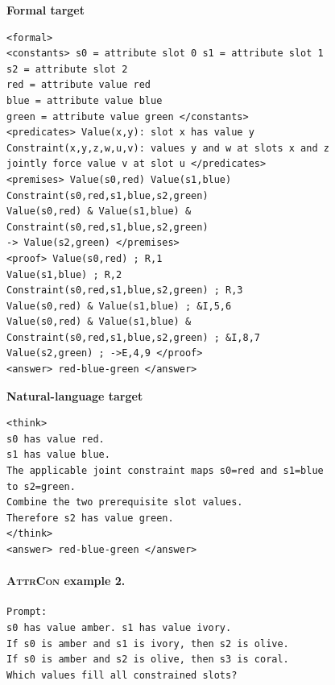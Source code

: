 \documentclass[11pt]{article}
\newcommand{\attrcon}{\textsc{AttrCon}}
\begin{document}
\noindent\begin{minipage}[t]{0.48\linewidth}
\textbf{Formal target}
\scriptsize
\begin{verbatim}
<formal>
<constants> s0 = attribute slot 0 s1 = attribute slot 1
s2 = attribute slot 2
red = attribute value red
blue = attribute value blue
green = attribute value green </constants>
<predicates> Value(x,y): slot x has value y
Constraint(x,y,z,w,u,v): values y and w at slots x and z
jointly force value v at slot u </predicates>
<premises> Value(s0,red) Value(s1,blue)
Constraint(s0,red,s1,blue,s2,green)
Value(s0,red) & Value(s1,blue) &
Constraint(s0,red,s1,blue,s2,green)
-> Value(s2,green) </premises>
<proof> Value(s0,red) ; R,1
Value(s1,blue) ; R,2
Constraint(s0,red,s1,blue,s2,green) ; R,3
Value(s0,red) & Value(s1,blue) ; &I,5,6
Value(s0,red) & Value(s1,blue) &
Constraint(s0,red,s1,blue,s2,green) ; &I,8,7
Value(s2,green) ; ->E,4,9 </proof>
<answer> red-blue-green </answer>
\end{verbatim}
\end{minipage}\hfill
\begin{minipage}[t]{0.48\linewidth}
\textbf{Natural-language target}
\scriptsize
\begin{verbatim}
<think>
s0 has value red.
s1 has value blue.
The applicable joint constraint maps s0=red and s1=blue
to s2=green.
Combine the two prerequisite slot values.
Therefore s2 has value green.
</think>
<answer> red-blue-green </answer>
\end{verbatim}
\end{minipage}

\paragraph{\attrcon{} example 2.}

\begin{verbatim}
Prompt:
s0 has value amber. s1 has value ivory.
If s0 is amber and s1 is ivory, then s2 is olive.
If s0 is amber and s2 is olive, then s3 is coral.
Which values fill all constrained slots?
\end{verbatim}
\end{document}
